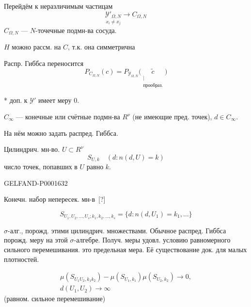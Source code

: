 Перейдём к неразличимым частицам
\begin{equation*}
\underset{x_i\ne x_j}{\mathcal{Y}'_{\Omega,N}}\longrightarrow C_{\Omega,N}
\end{equation*}
$C_{\Omega,N}$ — $N$-точечные подмн-ва сосуда.

$H$ можно рассм. на $C$, т.к. она симметрична


Распр. Гиббса переносится
\begin{equation*}
P_{C_{\Omega,N}}(c)=P_{\mathcal{Y}_{\Omega,N}}\bigl(\underset{\substack{\vert\\\text{прообраз.}}}{\widetilde c}\bigr)
\end{equation*}


* доп. к $\mathcal{Y}'$ имеет меру $0$.


$C_\infty$ — конечные или счётные подмн-ва $R^\nu$ (не имеющие пред. точек), $d\in C_\infty$.

На нём можно задать распред. Гиббса.



Цилиндрич. мн-во. $U\subset R^\nu$
\begin{equation*}
S_{U,k}\quad(d:n(d,U)=k)
\end{equation*}
число точек, попавших в $U$ равно $k$.

\begin{GelfandAdjacentEvidence}{GELFAND-P000163}{2}

Конечн. набор непересек. мн-в\, [?]
\end{GelfandAdjacentEvidence}

\begin{equation*}
S_{U_1,U_2,\ldots,U_s;k_1,k_2,\ldots,k_s}=\{d:n(d,U_1)=k_1,\ldots\}
\end{equation*}


$\sigma$-алг., порожд. этими цилиндрич. множествами.
Обычное распред. Гиббса порожд. меру на этой $\sigma$-алгебре.
Получ. меры удовл. условию равномерного сильного перемешивания. это предельная мера. Её существование док. для малых плотностей.


\begin{gather*}
\mu(S_{U_1U_2,k_1k_2})-\mu(S_{U_1,k_1})\mu(S_{U_2,k_2})\longrightarrow0,\\
d(U_1,U_2)\longrightarrow\infty
\end{gather*}
(равном. сильное перемешивание)

